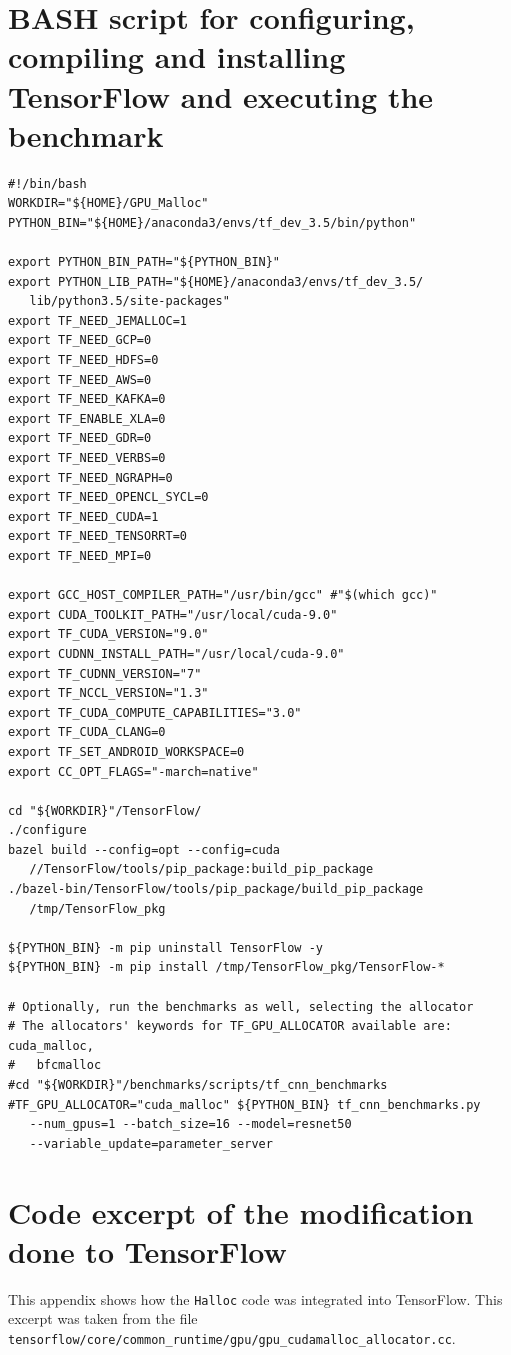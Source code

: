 \documentclass[12pt,twoside]{article}
\begin{document}



\newpage

\appendix
\section{BASH script for configuring, compiling and installing TensorFlow and executing the benchmark}\label{apx:bash-script}

\begin{verbatim}
#!/bin/bash
WORKDIR="${HOME}/GPU_Malloc"
PYTHON_BIN="${HOME}/anaconda3/envs/tf_dev_3.5/bin/python"

export PYTHON_BIN_PATH="${PYTHON_BIN}"
export PYTHON_LIB_PATH="${HOME}/anaconda3/envs/tf_dev_3.5/
   lib/python3.5/site-packages"
export TF_NEED_JEMALLOC=1
export TF_NEED_GCP=0
export TF_NEED_HDFS=0
export TF_NEED_AWS=0
export TF_NEED_KAFKA=0
export TF_ENABLE_XLA=0
export TF_NEED_GDR=0
export TF_NEED_VERBS=0
export TF_NEED_NGRAPH=0
export TF_NEED_OPENCL_SYCL=0
export TF_NEED_CUDA=1
export TF_NEED_TENSORRT=0
export TF_NEED_MPI=0

export GCC_HOST_COMPILER_PATH="/usr/bin/gcc" #"$(which gcc)"
export CUDA_TOOLKIT_PATH="/usr/local/cuda-9.0"
export TF_CUDA_VERSION="9.0"
export CUDNN_INSTALL_PATH="/usr/local/cuda-9.0"
export TF_CUDNN_VERSION="7"
export TF_NCCL_VERSION="1.3"
export TF_CUDA_COMPUTE_CAPABILITIES="3.0"
export TF_CUDA_CLANG=0
export TF_SET_ANDROID_WORKSPACE=0
export CC_OPT_FLAGS="-march=native"

cd "${WORKDIR}"/TensorFlow/
./configure
bazel build --config=opt --config=cuda
   //TensorFlow/tools/pip_package:build_pip_package
./bazel-bin/TensorFlow/tools/pip_package/build_pip_package 
   /tmp/TensorFlow_pkg

${PYTHON_BIN} -m pip uninstall TensorFlow -y
${PYTHON_BIN} -m pip install /tmp/TensorFlow_pkg/TensorFlow-*

# Optionally, run the benchmarks as well, selecting the allocator
# The allocators' keywords for TF_GPU_ALLOCATOR available are: cuda_malloc,
#   bfcmalloc
#cd "${WORKDIR}"/benchmarks/scripts/tf_cnn_benchmarks
#TF_GPU_ALLOCATOR="cuda_malloc" ${PYTHON_BIN} tf_cnn_benchmarks.py
   --num_gpus=1 --batch_size=16 --model=resnet50 
   --variable_update=parameter_server
\end{verbatim}

\section{Code excerpt of the modification done to TensorFlow}
\label{apx:gpu-cudamalloc}
This appendix shows how the \texttt{Halloc} code was integrated into TensorFlow. This excerpt was taken from the file \texttt{tensorflow/core/common\_runtime/gpu/gpu\_cudamalloc\_allocator.cc}.
\end{document}
